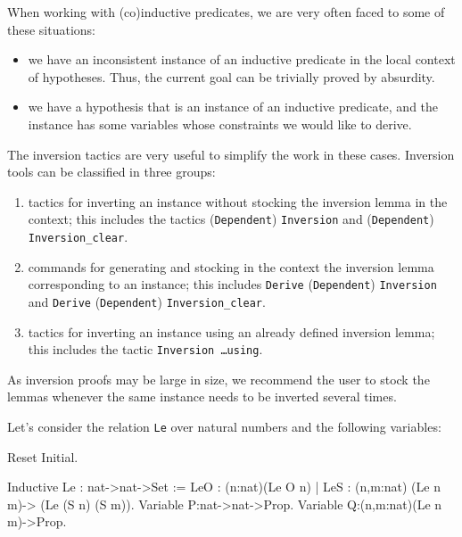 \begin{coq_example*}
When working with (co)inductive predicates, we are very often faced to
some of these situations:
\begin{itemize}
\item we have an inconsistent instance of an inductive predicate in the
  local context of hypotheses. Thus, the current goal can be trivially
  proved by absurdity. 
\item we have a hypothesis that is an instance of an inductive
  predicate, and the instance has some variables whose constraints we
  would like to derive.
\end{itemize}

The inversion tactics are very useful to simplify the work in these
cases. Inversion tools can be classified in three groups:

\begin{enumerate}
\item tactics for inverting an instance without stocking the inversion
  lemma in the context; this includes the tactics
  (\texttt{Dependent})  \texttt{Inversion} and
 (\texttt{Dependent}) \texttt{Inversion\_clear}.
\item commands for generating and stocking in the context the inversion
  lemma corresponding to an instance; this includes \texttt{Derive}
  (\texttt{Dependent}) \texttt{Inversion} and \texttt{Derive}
  (\texttt{Dependent}) \texttt{Inversion\_clear}.
\item tactics for inverting an instance using an already defined
  inversion lemma; this includes the tactic \texttt{Inversion \ldots using}.
\end{enumerate}

As inversion proofs may be large in size, we recommend the user to
stock the lemmas whenever the same instance needs to be inverted
several times.

\firstexample
{}

Let's consider the relation \texttt{Le} over natural numbers and the
following variables:

\begin{coq_eval}
Reset Initial.
\end{coq_eval}

\begin{coq_example*}
Inductive Le : nat->nat->Set :=
  LeO : (n:nat)(Le O n)  |  LeS : (n,m:nat) (Le n m)-> (Le (S n) (S m)).
Variable P:nat->nat->Prop.
Variable Q:(n,m:nat)(Le n m)->Prop.
\end{coq_example*}


\end{coq_example*}
